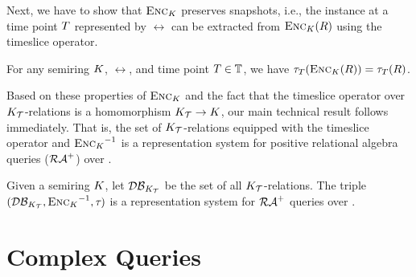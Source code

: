 Next, we have to show that $\textsc{Enc}_{K}$ preserves snapshots, i.e., %
the instance at a time point $T$ represented by $\rel$ can be extracted from $\textsc{Enc}_{K}(R)$ using the timeslice operator.

\begin{lem}\label{lem:encoding-timeslice-is-compatible}
  For any semiring $K$, \SKrel{} $\rel$, and time point $T \in \mathbb{T}$, we have
    $\tau_{T}(\textsc{Enc}_{K}(R)) = \tau_{T}(R)$.
\end{lem}

Based on these %
properties of $\textsc{Enc}_{K}$ and the fact that the timeslice operator over $K_{\mathcal{T}}$-relations is a homomorphism $K_{\mathcal{T}} \to K$, our main technical result follows immediately. That is, the set of $K_{\mathcal{T}}$-relations equipped with the timeslice operator and ${{\textsc{Enc}_{K}}^{-1}}$ is a representation system for positive relational algebra queries ($\mathcal{RA}^{+}$) over \SKrels{}.

\begin{theo}\label{theo:repr-system}
  Given a semiring $K$, let $\mathcal{DB}_{K_{\mathcal{T}}}$ be the set of all $K_{\mathcal{T}}$-relations. The triple $(\mathcal{DB}_{K_{\mathcal{T}}}, {{\textsc{Enc}_{K}}^{-1}}, \tau_{})$ is a representation system for $\mathcal{RA}^{+}$ queries over \SKrels{}.
\end{theo}

\section{Complex Queries}
\label{sec:complex-queries}

